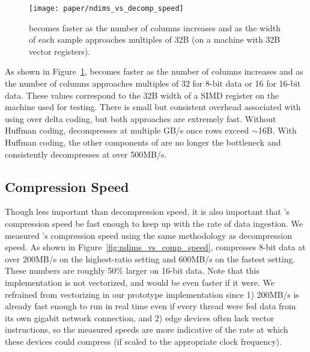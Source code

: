 \begin{figure}[h]
\begin{center}
    \texttt{[image: paper/ndims\_vs\_decomp\_speed]}
    \caption{\minesp becomes faster as the number of columns increases and as the width of each sample approaches multiples of 32B (on a machine with 32B vector registers).}
    \label{fig:ndims_vs_decomp_speed}
\end{center}
\end{figure}

As shown in Figure~\ref{fig:ndims_vs_decomp_speed}, \minesp becomes faster as the number of columns increases and as the number of columns approaches multiples of 32 for 8-bit data or 16 for 16-bit data. These values correspond to the 32B width of a SIMD register on the machine used for testing. There is small but consistent overhead associated with using \fire over delta coding, but both approaches are extremely fast. Without Huffman coding, \minesp decompresses at multiple GB/s once rows exceed $\sim$16B. With Huffman coding, the other components of \minesp are no longer the bottleneck and \minesp consistently decompresses at over 500MB/s.

\subsection{Compression Speed} \label{sec:comp_speed}

Though less important than decompression speed, it is also important that \mine's compression speed be fast enough to keep up with the rate of data ingestion. We measured \mine's compression speed using the same methodology as decompression speed. As shown in Figure~\ref{fig:ndims_vs_comp_speed}, \mine \text{} compresses 8-bit data at over 200MB/s on the highest-ratio setting and 600MB/s on the fastest setting. These numbers are roughly 50\% larger on 16-bit data. Note that this implementation is not vectorized, and would be even faster if it were. We refrained from vectorizing in our prototype implementation since 1) 200MB/s is already fast enough to run in real time even if every thread were fed data from its own gigabit network connection, and 2) edge devices often lack vector instructions, so the measured speeds are more indicative of the rate at which these devices could compress (if scaled to the appropriate clock frequency).

